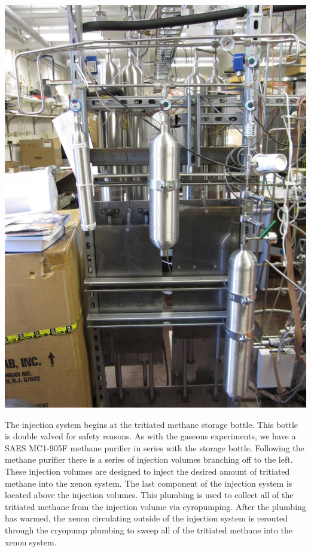 \documentclass[a4paper,12pt]{article}
\begin{document}
\begin{center}
\includegraphics{UMDIS.png}
\end{center}

The injection system begins at the tritiated methane storage bottle.  This bottle is double valved for safety reasons.  As with the gaseous experiments, we have a SAES MC1-905F methane purifier in series with the storage bottle.  Following the methane purifier there is a series of injection volumes branching off to the left.  These injection volumes are designed to inject the desired amount of tritiated methane into the xenon system.  The last component of the injection system is located above the injection volumes.  This plumbing is used to collect all of the tritiated methane from the injection volume via cyropumping.  After the plumbing has warmed, the xenon circulating outside of the injection system is rerouted through the cryopump plumbing to sweep all of the tritiated methane into the xenon system.
\end{document}
